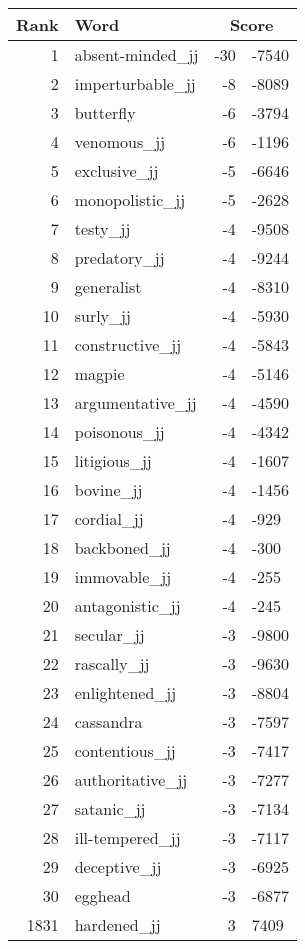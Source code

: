 \begin{longtable}[!htbp]{| rlr@{.}l |}
    \hline
    \textbf{Rank} & \textbf{Word} & \multicolumn{2}{c|}{\textbf{Score}} \\
    \hline
    \endhead
    1 & absent-minded\_jj & -30 & -7540 \\
    2 & imperturbable\_jj & -8 & -8089 \\
    3 & butterfly & -6 & -3794 \\
    4 & venomous\_jj & -6 & -1196 \\
    5 & exclusive\_jj & -5 & -6646 \\
    6 & monopolistic\_jj & -5 & -2628 \\
    7 & testy\_jj & -4 & -9508 \\
    8 & predatory\_jj & -4 & -9244 \\
    9 & generalist & -4 & -8310 \\
    10 & surly\_jj & -4 & -5930 \\
    11 & constructive\_jj & -4 & -5843 \\
    12 & magpie & -4 & -5146 \\
    13 & argumentative\_jj & -4 & -4590 \\
    14 & poisonous\_jj & -4 & -4342 \\
    15 & litigious\_jj & -4 & -1607 \\
    16 & bovine\_jj & -4 & -1456 \\
    17 & cordial\_jj & -4 & -929 \\
    18 & backboned\_jj & -4 & -300 \\
    19 & immovable\_jj & -4 & -255 \\
    20 & antagonistic\_jj & -4 & -245 \\
    21 & secular\_jj & -3 & -9800 \\
    22 & rascally\_jj & -3 & -9630 \\
    23 & enlightened\_jj & -3 & -8804 \\
    24 & cassandra & -3 & -7597 \\
    25 & contentious\_jj & -3 & -7417 \\
    26 & authoritative\_jj & -3 & -7277 \\
    27 & satanic\_jj & -3 & -7134 \\
    28 & ill-tempered\_jj & -3 & -7117 \\
    29 & deceptive\_jj & -3 & -6925 \\
    30 & egghead & -3 & -6877 \\
    1831 & hardened\_jj & 3 & 7409 \\

\end{longtable}
